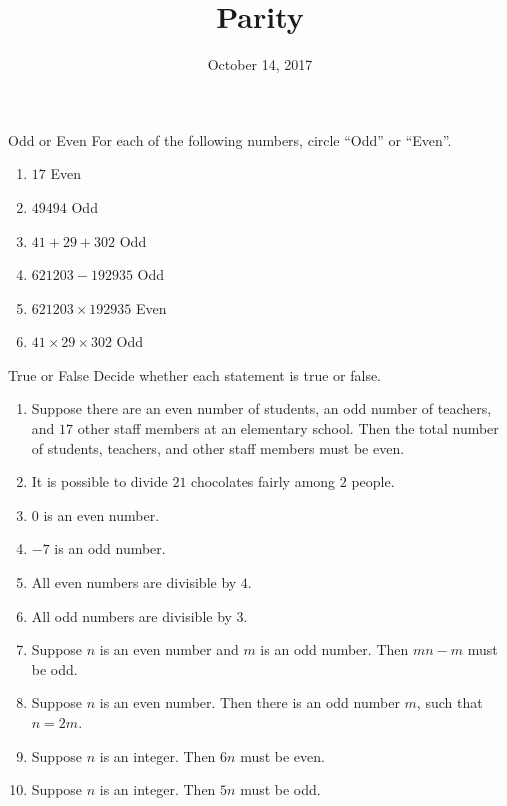 \documentclass[12pt,letterpaper]{article}
\title{Parity}
\date{October 14, 2017}
\begin{document}
\maketitle

\thispagestyle{empty}

\begin{problem}{Odd or Even}
For each of the following numbers, circle ``Odd'' or ``Even''.
\begin{enumerate}
 \item $17$ \hfill {} \hspace{1em} Even
 \item $49494$ \hfill Odd \hspace{1em} 
 \item $41 + 29 + 302$ \hfill Odd \hspace{1em} 
 \item $621203 - 192935$ \hfill Odd \hspace{1em} 
 \item $621203 \times 192935$ \hfill {} \hspace{1em} Even
 \item $41 \times 29 \times 302$ \hfill Odd \hspace{1em} 
\end{enumerate}
\end{problem}

\begin{problem}{True or False}
  Decide whether each statement is true or false.

  \begin{enumerate}
    \item Suppose there are an even number of students, an odd number of
    teachers, and $17$ other staff members at an elementary school. Then the
    total number of students, teachers, and other staff members must be even.
    \hfill \TFTrue
    \item It is possible to divide \(21\) chocolates fairly among \(2\) people.
    \hfill \TFFalse
    \item \(0\) is an even number. \hfill \TFTrue
    \item \(-7\) is an odd number. \hfill \TFTrue
    \item All even numbers are divisible by \(4\). \hfill \TFFalse
    \item All odd numbers are divisible by \(3\). \hfill \TFFalse
    \item Suppose \(n\) is an even number and \(m\) is an odd number. Then \(mn -
    m\) must be odd. \hfill \TFTrue
    \item Suppose \(n\) is an even number. Then there is an odd number \(m\),
    such that \(n = 2m\). \hfill \TFFalse
    \item Suppose \(n\) is an integer. Then \(6n\) must be even. \hfill \TFTrue
    \item Suppose \(n\) is an integer. Then \(5n\) must be odd. \hfill \TFFalse
  \end{enumerate}
\end{problem}
\end{document}
